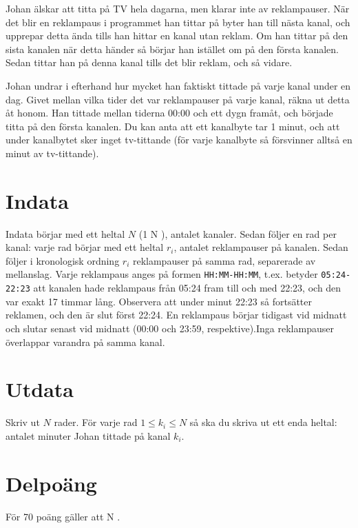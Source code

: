 
Johan älskar att titta på TV hela dagarna, men klarar inte av reklampauser. När det blir en reklampaus i programmet han tittar på byter han till nästa kanal, och upprepar detta ända tills han hittar en kanal utan reklam. Om han tittar på den sista kanalen när detta händer så börjar han istället om på den första kanalen. Sedan tittar han på denna kanal tills det blir reklam, och så vidare.

Johan undrar i efterhand hur mycket han faktiskt tittade på varje kanal under en dag. Givet mellan vilka tider det var reklampauser på varje kanal, räkna ut detta åt honom. Han tittade mellan tiderna 00:00 och ett dygn framåt, och började titta på den första kanalen. Du kan anta att ett kanalbyte tar 1 minut, och att under kanalbytet sker inget tv-tittande (för varje kanalbyte så försvinner alltså en minut av tv-tittande).

\section*{Indata}
Indata börjar med ett heltal $N$ (1 \leq N ), antalet kanaler. Sedan följer en rad per kanal: varje rad börjar med ett heltal $r_i$, antalet reklampauser på kanalen. Sedan följer i kronologisk ordning $r_i$ reklampauser på samma rad, separerade av mellanslag. Varje reklampaus anges på formen \texttt{HH:MM-HH:MM}, t.ex. betyder \texttt{05:24-22:23} att kanalen hade reklampaus från 05:24 fram till och med 22:23, och den var exakt 17 timmar lång. Observera att under minut 22:23 så fortsätter reklamen, och den är slut först 22:24. En reklampaus börjar tidigast vid midnatt och slutar senast vid midnatt (00:00 och 23:59, respektive).Inga reklampauser överlappar varandra på samma kanal.

\section*{Utdata}
Skriv ut $N$ rader. För varje rad $1 \leq k_i \leq N$ så ska du skriva ut ett enda heltal: antalet minuter Johan tittade på kanal $k_i$.

\section*{Delpoäng}
För 70 poäng gäller att N .
